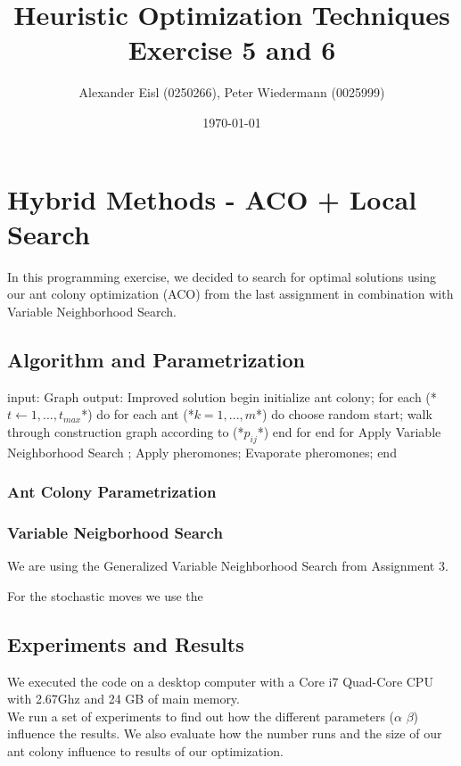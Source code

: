 \documentclass{scrartcl}
\author{Alexander Eisl (0250266), Peter Wiedermann (0025999)}
\date{\today}
\title{Heuristic Optimization Techniques \\ Exercise 5 and 6}
\begin{document}
\maketitle


\section{Hybrid Methods - ACO + Local Search}
\label{sec:hybdrin_methods}

In this programming exercise, we decided to search for optimal
solutions using our ant colony optimization (ACO) from the last assignment
in combination with Variable Neighborhood Search.

\subsection{Algorithm and Parametrization}

\begin{algorithm}[caption={Ant Colony - VNS Hybrid}]
    input: Graph 
    output: Improved solution
    begin
        initialize ant colony;
        for each (*$t \leftarrow 1,...,t_{max}$*) do
      	    for each ant (*$k = 1,...,m$*) do
               choose random start;
               walk through construction graph according to (*$p_{ij}$*)
            end for
        end for
        Apply Variable Neighborhood Search ;
        Apply pheromones;
        Evaporate pheromones;
    end
\end{algorithm}



\subsubsection{Ant Colony Parametrization}
\label{construction_graph}


\subsubsection{Variable Neigborhood Search}

We are using the Generalized Variable Neighborhood Search from Assignment 3.

For the stochastic moves we use the 


\subsection{Experiments and Results}
We executed the code on a desktop computer with a Core i7 Quad-Core
CPU with 2.67Ghz and 24 GB of main memory. \\

We run a set of experiments to find out how the different parameters
($\alpha$ $\beta$) influence the results. We also evaluate how the
number runs and the size of our ant colony influence to results of our
optimization. \\
\end{document}

